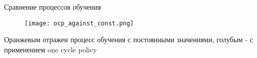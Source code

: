 
\begin{frame}{Сравнение процессов обучения}
\begin{figure}
\centering
\texttt{[image: ocp\_against\_const.png]}
\end{figure}
    Оранжевым отражен процесс обучения с постоянными значениями, голубым - с
    применением one cycle policy
\end{frame}